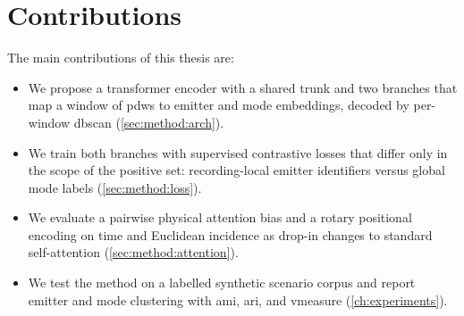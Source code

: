\section{Contributions}\label{sec:intro:contributions}

The main contributions of this thesis are:
\begin{itemize}
  \item We propose a transformer encoder with a shared trunk and two branches that map a window of \glspl{pdw} to emitter and mode embeddings, decoded by per-window \gls{dbscan} (\cref{sec:method:arch}).
  \item We train both branches with supervised contrastive losses that differ only in the scope of the positive set: recording-local emitter identifiers versus global mode labels (\cref{sec:method:loss}).
  \item We evaluate a pairwise physical attention bias and a rotary positional encoding on time and Euclidean incidence as drop-in changes to standard self-attention (\cref{sec:method:attention}).
  \item We test the method on a labelled synthetic scenario corpus and report emitter and mode clustering with \gls{ami}, \gls{ari}, and \gls{vmeasure} (\cref{ch:experiments}).
\end{itemize}
